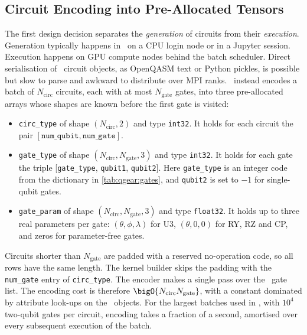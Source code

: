 \subsection{Circuit Encoding into Pre-Allocated Tensors}\label{sec:qgear:encoding}

The first design decision separates the \emph{generation} of circuits from their \emph{execution}. Generation typically happens in \qiskit\ on a CPU login node or in a Jupyter session. Execution happens on GPU compute nodes behind the batch scheduler. Direct serialisation of \qiskit\ circuit objects, as OpenQASM text or Python pickles, is possible but slow to parse and awkward to distribute over MPI ranks. \qgear\ instead encodes a batch of $N_{\mathrm{circ}}$ circuits, each with at most $N_{\mathrm{gate}}$ gates, into three pre-allocated arrays whose shapes are known before the first gate is visited:
\begin{itemize}
  \item \texttt{circ\_type} of shape $(N_{\mathrm{circ}},2)$ and type \texttt{int32}. It holds for each circuit the pair $[\texttt{num\_qubit},\texttt{num\_gate}]$.
  \item \texttt{gate\_type} of shape $(N_{\mathrm{circ}},N_{\mathrm{gate}},3)$ and type \texttt{int32}. It holds for each gate the triple [\texttt{gate\_type}, \texttt{qubit1}, \texttt{qubit2}]. Here \texttt{gate\_type} is an integer code from the dictionary in \cref{tab:qgear:gates}, and \texttt{qubit2} is set to $-1$ for single-qubit gates.
  \item \texttt{gate\_param} of shape $(N_{\mathrm{circ}},N_{\mathrm{gate}},3)$ and type \texttt{float32}. It holds up to three real parameters per gate: $(\theta,\phi,\lambda)$ for U3, $(\theta,0,0)$ for RY, RZ and CP, and zeros for parameter-free gates.
\end{itemize}
Circuits shorter than $N_{\mathrm{gate}}$ are padded with a reserved no-operation code, so all rows have the same length. The kernel builder skips the padding with the \texttt{num\_gate} entry of \texttt{circ\_type}. The encoder makes a single pass over the \qiskit\ gate list. The encoding cost is therefore $\bigO{N_{\mathrm{circ}}N_{\mathrm{gate}}}$, with a constant dominated by attribute look-ups on the \qiskit\ objects. For the largest batches used in \cite{guo2025qgear}, with $10^{4}$ two-qubit gates per circuit, encoding takes a fraction of a second, amortised over every subsequent execution of the batch.

